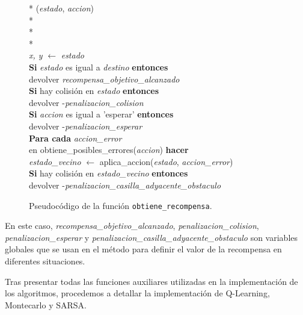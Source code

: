 \documentclass[conference,a4paper]{IEEEtran}
\begin{document}
\begin{figure}[h]
  \begin{pseudo}*
    (\textit{estado}, \textit{accion}) \\*
     \\*
     \\*
     \\
    \textit{x, y} $\leftarrow$ \textit{estado} \\
    \textbf{Si} \textit{estado} es igual a \textit{destino} \textbf{entonces} \\
    \> devolver \textit{recompensa\_objetivo\_alcanzado} \\
    \textbf{Si} hay colisión en \textit{estado} \textbf{entonces} \\
    \> devolver -\textit{penalizacion\_colision} \\
    \textbf{Si} \textit{accion} es igual a 'esperar' \textbf{entonces} \\
    \> devolver -\textit{penalizacion\_esperar} \\
    \textbf{Para cada} \textit{accion\_error} \\ en obtiene\_posibles\_errores(\textit{accion}) \textbf{hacer} \\
    \> \textit{estado\_vecino} $\leftarrow$ aplica\_accion(\textit{estado}, \textit{accion\_error}) \\
    \> \textbf{Si} hay colisión en \textit{estado\_vecino} \textbf{entonces} \\
    \> \> devolver -\textit{penalizacion\_casilla\_adyacente\_obstaculo} \\
  \end{pseudo}
  \caption{Pseudocódigo de la función \texttt{obtiene\_recompensa}.}
  \label{fig:obtiene_recompensa}
\end{figure}

En este caso, \textit{recompensa\_objetivo\_alcanzado}, \textit{penalizacion\_colision}, \textit{penalizacion\_esperar} y \textit{penalizacion\_casilla\_adyacente\_obstaculo}
son variables globales que se usan en el método para definir el valor de la recompensa en diferentes situaciones.\newline

Tras presentar todas las funciones auxiliares utilizadas en la implementación de los algoritmos, procedemos a detallar la implementación de Q-Learning, Montecarlo y SARSA.\newline 
\end{document}
